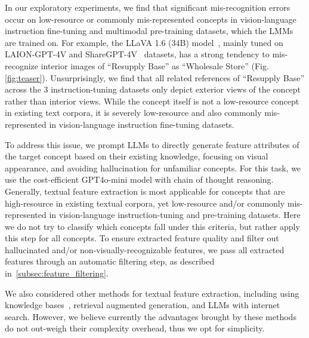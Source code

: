 In our exploratory experiments, we find that significant mis-recognition errors occur on low-resource or commonly mis-represented concepts in vision-language instruction fine-tuning and multimodal pre-training datasets, which the LMMs are trained on. For example, the LLaVA 1.6 (34B) model~\cite{liu2024llavanext}, mainly tuned on LAION-GPT-4V\cite{2024LAIONGPT4V} and ShareGPT-4V~\cite{chen2023sharegpt4v} datasets, has a strong tendency to mis-recognize interior images of ``Resupply Base'' as ``Wholesale Store'' (Fig.\ref{fig:teaser}). Unsurprisingly, we find that all related references of ``Resupply Base'' across the 3 instruction-tuning datasets only depict exterior views of the concept rather than interior views. While the concept itself is not a low-resource concept in existing text corpora, it is severely low-resource and also commonly mis-represented in vision-language instruction fine-tuning datasets.



To address this issue, we prompt LLMs to directly generate feature attributes of the target concept based on their existing knowledge, focusing on visual appearance, and avoiding hallucination for unfamiliar concepts. For this task, we use the cost-efficient GPT4o-mini model with chain of thought reasoning. Generally, textual feature extraction is most applicable for concepts that are high-resource in existing textual corpora, yet low-resource and/or commonly mis-represented in vision-language instruction-tuning and pre-training datasets. Here we do not try to classify which concepts fall under this criteria, but rather apply this step for all concepts. To ensure extracted feature quality and filter out hallucinated and/or non-visually-recognizable features, we pass all extracted features through an automatic filtering step, as described in~\ref{subsec:feature_filtering}.

We also considered other methods for textual feature extraction, including using knowledge bases~\cite{jin2024armada}, retrieval augmented generation, and LLMs with internet search. However, we believe currently the advantages brought by these methods do not out-weigh their complexity overhead, thus we opt for simplicity.






